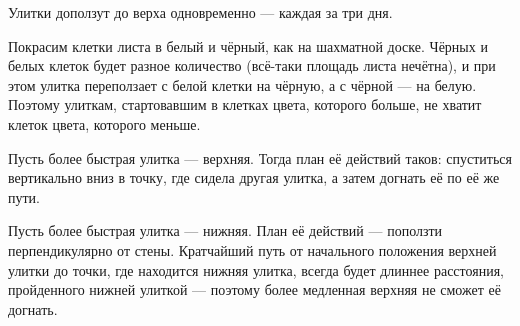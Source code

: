 \begin{itemize}

\itA Улитки доползут до верха одновременно — каждая за три дня.

\itB Покрасим клетки листа в белый и чёрный, как на шахматной доске. Чёрных и белых клеток будет разное количество (всё-таки площадь листа нечётна), и при этом улитка переползает с белой клетки на чёрную, а с чёрной — на белую. Поэтому улиткам, стартовавшим в клетках цвета, которого больше, не хватит клеток цвета, которого меньше. 

\itC Пусть более быстрая улитка — верхняя. Тогда план её действий таков: спуститься вертикально вниз в точку, где сидела другая улитка, а затем догнать её по её же пути.

Пусть более быстрая улитка — нижняя. План её действий — поползти перпендикулярно от стены. Кратчайший путь от начального положения верхней улитки до точки, где находится нижняя улитка, всегда будет длиннее расстояния, пройденного нижней улиткой — поэтому более медленная верхняя не сможет её догнать.
\end{itemize}